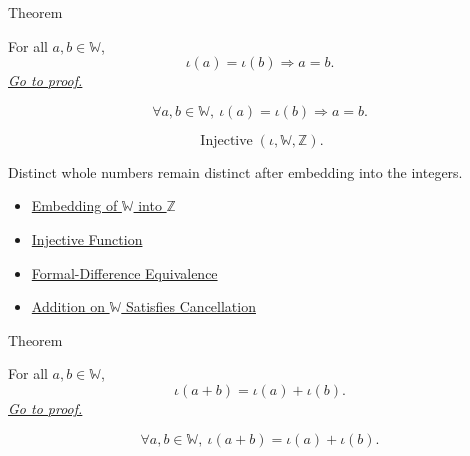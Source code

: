 \begin{theorembox}{Theorem}
\begin{theorem}
\label{thm:embedding-w-into-z-injective}
For all $a,b\in\mathbb{W}$,
\[
\iota(a)=\iota(b)\Longrightarrow a=b.
\]
\hyperref[prf:embedding-w-into-z-injective]{\textit{Go to proof.}}
\end{theorem}
\end{theorembox}

\begin{remark*}
\[
\forall a,b\in\mathbb{W},\ \iota(a)=\iota(b)\Longrightarrow a=b.
\]
\end{remark*}

\begin{remark*}
\[
\operatorname{Injective}(\iota,\mathbb{W},\mathbb{Z}).
\]
\end{remark*}

\begin{remark*}[Interpretation]
Distinct whole numbers remain distinct after embedding into the integers.
\end{remark*}

\begin{dependencies}
\begin{itemize}
  \item \hyperref[def:canonical-embedding-w-into-z]{Embedding of $\mathbb{W}$ into $\mathbb{Z}$}
  \item \hyperref[def:injective]{Injective Function}
  \item \hyperref[def:formal-difference-equivalence]{Formal-Difference Equivalence}
  \item \hyperref[thm:addition-on-w-cancellation]{Addition on $\mathbb{W}$ Satisfies Cancellation}
\end{itemize}
\end{dependencies}

\begin{theorembox}{Theorem}
\begin{theorem}
\label{thm:embedding-w-into-z-preserves-addition}
For all $a,b\in\mathbb{W}$,
\[
\iota(a+b)=\iota(a)+\iota(b).
\]
\hyperref[prf:embedding-w-into-z-preserves-addition]{\textit{Go to proof.}}
\end{theorem}
\end{theorembox}

\begin{remark*}
\[
\forall a,b\in\mathbb{W},\ \iota(a+b)=\iota(a)+\iota(b).
\]
\end{remark*}

